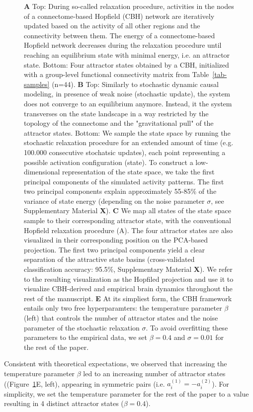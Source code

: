 \documentclass{article}
\begin{document}
\begin{figure}[!htbp]
{\textbf{A} Top: During so-called relaxation procedure, activities in the nodes of a connectome-based Hopfield (CBH) network are iteratively updated based on the activity of all other regions and the connectivity between them.
The energy of a connectome-based Hopfield network decreases during the relaxation procedure until reaching an equilibrium state with minimal energy, i.e. an attractor state.
Bottom: Four attractor states obtained by a CBH, initialized with a group-level functional connectivity matrix from Table~\ref{tab-samples} (n=44).
\textbf{B} Top: Similarly to stochastic dynamic causal modeling, in presence of weak noise (stochastic update), the system does not converge to an equilibrium anymore. Instead, it the system transverses on the state landscape in a way restricted by the topology of the connectome and the "gravitational pull" of the attractor states.
Bottom: We sample the state space by running the stochastic relaxation procedure for an extended amount of time (e.g. 100.000 consecutive stochatsic updates), each point representing a possible activation configuration (state). To construct a low-dimensional representation of the state space, we take the first principal components of the simulated activity patterns. The first two principal components explain approximately 55-85\% of the variance of state energy (depending on the noise parameter $\sigma$, see Supplementary Material \textbf{X}).
\textbf{C} We map all states of the state space sample to their corresponding attractor state, with the conventional Hopfield relaxation procedure (A). The four attractor states are also visualized in their corresponding position on the PCA-based projection. The first two principal components yield a clear separation of the attractive state basins (cross-validated classification accuracy: 95.5\%, Supplementary Material \textbf{X}). We refer to the resulting visualization as the Hopfiled projection and use it to visualize CBH-derived and empirical brain dynamics throughout the rest of the manuscript.
\textbf{E} At its simpliest form, the CBH framework entails only two free hyperparamters: the temperature parameter $\beta$ (left) that controls the number of attractor states and the noise parameter of the stochastic relaxation $\sigma$. To avoid overfitting these parameters to the empirical data, we set $\beta=0.4$ and $\sigma=0.01$ for the rest of the paper.}
\label{attractors}
\end{figure}

Consistent with theoretical expectations, we observed that increasing the temperature parameter $\beta$ led to an increasing number of attractor states ((Figure~\ref{attractors}E, left), appearing in symmetric pairs (i.e. $a_i^{(1)} = -a_i^{(2)}$).
For simplicity, we set the temperature parameter for the rest of the paper to a value resulting in 4 distinct attractor states ($\beta=0.4$).
\end{document}
